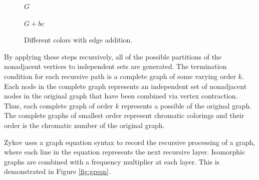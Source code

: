 \begin{figure}[H]
  \begin{minipage}{2.5in}
    \centering

    \(G\)
  \end{minipage}
  \begin{minipage}{2.5in}
    \centering

    \(G+bc\)
  \end{minipage}
  \caption{Different colors with edge addition.}
  \label{fig:zeadd}
\end{figure}

By applying these steps recursively, all of the possible partitions of the nonadjacent vertices to independent sets
are generated.  The termination condition for each recursive path is a complete graph of some varying order \(k\).
Each node in the complete graph represents an independent set of nonadjacent nodes in the original graph that have
been combined via vertex contraction.  Thus, each complete graph of order \(k\) represents a possible 
of the original graph.  The complete graphs of smallest order represent chromatic colorings and their order is the
chromatic number of the original graph.

Zykov uses a graph equation syntax to record the recursive processing of a graph, where each line in the equation
represents the next recursive layer.  Isomorphic graphs are combined with a frequency multiplier at each layer.
This is demonstrated in Figure \ref{fig:greqn}.

